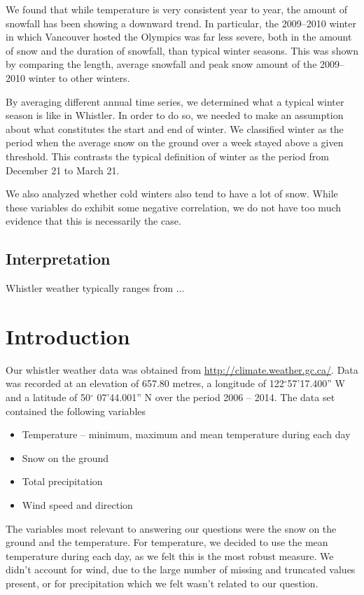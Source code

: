 \documentclass[12pt,twoside]{article}
\begin{document}
{\noindent We found that while temperature is very consistent year to year, the amount of snowfall has been showing a downward trend. In particular, the 2009--2010 winter in which Vancouver hosted the Olympics was far less severe, both in the amount of snow and the duration of snowfall, than typical winter seasons. This was shown by comparing the length, average snowfall and peak snow amount of the 2009--2010 winter to other winters.

By averaging different annual time series, we determined what a typical winter season is like in Whistler. In order to do so, we needed to make an assumption about what constitutes the start and end of winter. We classified winter as the period when the average snow on the ground over a week stayed above a given threshold. This contrasts the typical definition of winter as the period from December 21 to March 21.

We also analyzed whether cold winters also tend to have a lot of snow. While these variables do exhibit some negative correlation, we do not have too much evidence that this is necessarily the case.

\subsection{Interpretation}

Whistler weather typically ranges from $\dots$

\section{Introduction}

Our whistler weather data was obtained from \url{http://climate.weather.gc.ca/}. Data was recorded at an elevation of 657.80 metres, a longitude of 122$^{\circ}$57'17.400'' W and a latitude of 50$^{\circ}$ 07'44.001'' N over the period 2006 -- 2014. The data set contained the following variables

\begin{itemize}
\item Temperature -- minimum, maximum and mean temperature during each day
\item Snow on the ground 
\item Total precipitation 
\item Wind speed and direction
\end{itemize}

\medskip\noindent The variables most relevant to answering our questions were the snow on the ground and the temperature. For temperature, we decided to use the mean temperature during each day, as we felt this is the most robust measure. We didn't account for wind, due to the large number of missing and truncated values present, or for precipitation which we felt wasn't related to our question. 

}
\end{document}
